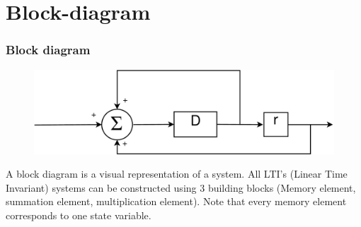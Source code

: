 \section{Block-diagram}
\begin{frame}
	\frametitle{Block diagram}
			\begin{figure}
				\centering
				\includegraphics[width=0.7\linewidth]{Images/Discrete_time_eps_3}
			\end{figure}


	\vspace{-1.5em}
	\begin{definition}
			A block diagram is a visual representation of a system. All LTI’s (Linear Time Invariant) systems can be constructed using 3 building blocks (Memory element, summation element, multiplication element). Note that every memory element corresponds to one state variable.
	\end{definition}
\end{frame}
